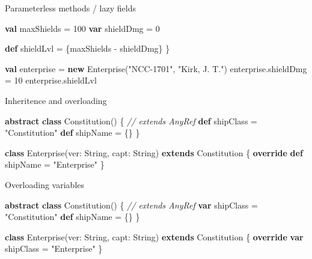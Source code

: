 \documentclass[ignorenonframetext,]{beamer}
\newenvironment{Shaded}{\begin{snugshade}}{\end{snugshade}}
\newcommand{\KeywordTok}[1]{\textcolor[rgb]{0.13,0.29,0.53}{\textbf{#1}}}
\newcommand{\DecValTok}[1]{\textcolor[rgb]{0.00,0.00,0.81}{#1}}
\newcommand{\StringTok}[1]{\textcolor[rgb]{0.31,0.60,0.02}{#1}}
\newcommand{\CommentTok}[1]{\textcolor[rgb]{0.56,0.35,0.01}{\textit{#1}}}
\newcommand{\FunctionTok}[1]{\textcolor[rgb]{0.00,0.00,0.00}{#1}}
\newcommand{\NormalTok}[1]{#1}
\begin{document}
\begin{frame}[fragile]
\begin{block}{Parameterless methods / lazy fields}
\begin{Shaded}
\begin{Highlighting}[]
    \KeywordTok{val}\NormalTok{ maxShields = }\DecValTok{100}
    \KeywordTok{var}\NormalTok{ shieldDmg = }\DecValTok{0}

    \KeywordTok{def}\NormalTok{ shieldLvl = \{maxShields - shieldDmg\}}
\NormalTok{\}}

\KeywordTok{val}\NormalTok{ enterprise = }\KeywordTok{new} \FunctionTok{Enterprise}\NormalTok{(}\StringTok{"NCC-1701"}\NormalTok{, }\StringTok{"Kirk, J. T."}\NormalTok{)}
\NormalTok{enterprise.}\FunctionTok{shieldDmg}\NormalTok{ = }\DecValTok{10}
\NormalTok{enterprise.}\FunctionTok{shieldLvl}
\end{Highlighting}
\end{Shaded}

\end{block}

\begin{block}{Inheritence and overloading}

\begin{Shaded}
\begin{Highlighting}[]
\KeywordTok{abstract} \KeywordTok{class} \FunctionTok{Constitution}\NormalTok{() \{ }\CommentTok{// extends AnyRef}
    \KeywordTok{def}\NormalTok{ shipClass = }\StringTok{"Constitution"}
    \KeywordTok{def}\NormalTok{ shipName = \{\}}
\NormalTok{\}}

\KeywordTok{class} \FunctionTok{Enterprise}\NormalTok{(ver: String, capt: String) }\KeywordTok{extends}\NormalTok{ Constitution \{}
    \KeywordTok{override} \KeywordTok{def}\NormalTok{ shipName = }\StringTok{"Enterprise"}
\NormalTok{\}}
\end{Highlighting}
\end{Shaded}

\end{block}

\begin{block}{Overloading variables}

\begin{Shaded}
\begin{Highlighting}[]
\KeywordTok{abstract} \KeywordTok{class} \FunctionTok{Constitution}\NormalTok{() \{ }\CommentTok{// extends AnyRef}
    \KeywordTok{var}\NormalTok{ shipClass = }\StringTok{"Constitution"}
    \KeywordTok{def}\NormalTok{ shipName = \{\}}
\NormalTok{\}}

\KeywordTok{class} \FunctionTok{Enterprise}\NormalTok{(ver: String, capt: String) }\KeywordTok{extends}\NormalTok{ Constitution \{}
    \KeywordTok{override} \KeywordTok{var}\NormalTok{ shipClass = }\StringTok{"Enterprise"}
\NormalTok{\}}
\end{Highlighting}
\end{Shaded}


\end{block}
\end{frame}
\end{document}

